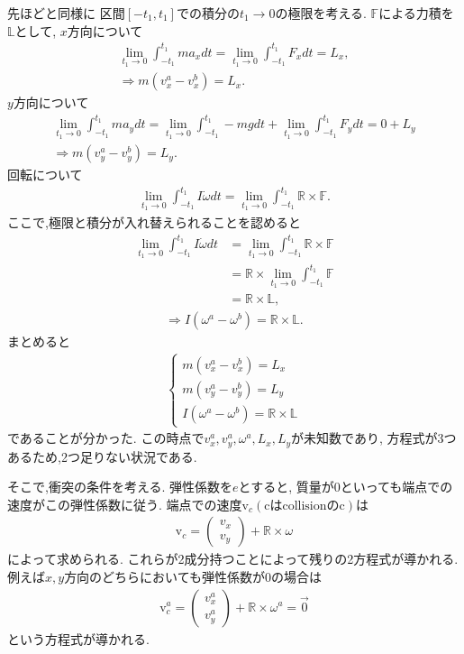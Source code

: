 \documentclass[a4paper,11pt]{jsarticle}
\begin{document}
先ほどと同様に
区間$[-t_1, t_1]$での積分の$t_1\rightarrow 0$の極限を考える.
$\mathbb{F}$による力積を$\mathbb{L}$として,
$x$方向について
\begin{gather*}
  \lim_{t_1 \rightarrow 0}\int_{-t_1}^{t_1} m a_x dt = \lim_{t_1 \rightarrow 0}\int_{-t_1}^{t_1} F_x dt = L_x,
  \\
  \Rightarrow
  m (v_x^a - v_x^b) = L_x.
\end{gather*}
$y$方向について
\begin{gather*}
  \lim_{t_1 \rightarrow 0}\int_{-t_1}^{t_1} m a_y dt
  = \lim_{t_1 \rightarrow 0}\int_{-t_1}^{t_1} -mg dt 
  + \lim_{t_1 \rightarrow 0}\int_{-t_1}^{t_1} F_y dt = 0 + L_y
  \\
  \Rightarrow
  m (v_y^a - v_y^b) = L_y.
\end{gather*}
回転について
\begin{align*}
  \lim_{t_1 \rightarrow 0} \int_{-t_1}^{t_1} I\dot\omega dt
  = \lim_{t_1 \rightarrow 0} \int_{-t_1}^{t_1} \mathbb{R} \times \mathbb{F}.
\end{align*}
ここで,極限と積分が入れ替えられることを認めると
\begin{align*}
  \lim_{t_1 \rightarrow 0} \int_{-t_1}^{t_1} I\dot\omega dt
  &= \lim_{t_1 \rightarrow 0} \int_{-t_1}^{t_1} \mathbb{R} \times \mathbb{F}
  \\ &= \mathbb{R} \times \lim_{t_1 \rightarrow 0} \int_{-t_1}^{t_1} \mathbb{F}
  \\ &= \mathbb{R} \times \mathbb{L},
\end{align*}
\begin{gather*}
  \Rightarrow
  I (\omega^a - \omega^b) = \mathbb{R} \times \mathbb{L}.
\end{gather*}
まとめると
\begin{gather*}
  \begin{cases}
    m (v_x^a - v_x^b) = L_x
    \\
    m (v_y^a - v_y^b) = L_y
    \\
    I (\omega^a - \omega^b) = \mathbb{R} \times \mathbb{L}
  \end{cases}
\end{gather*}
であることが分かった.
この時点で$v_x^a, v_y^a, \omega^a, L_x, L_y$が未知数であり,
方程式が3つあるため,2つ足りない状況である.

そこで,衝突の条件を考える.
弾性係数を$e$とすると,
質量が0といっても端点での速度がこの弾性係数に従う.
端点での速度$\mathrm{v}_c (\text{cはcollisionのc})$は
\begin{gather}
  \mathrm{v}_c = \begin{pmatrix}
    v_x
    \\
    v_y
  \end{pmatrix} + \mathbb{R} \times \omega
\end{gather}
によって求められる.
これらが2成分持つことによって残りの2方程式が導かれる.
例えば$x,y$方向のどちらにおいても弾性係数が0の場合は
\begin{gather*}
  \mathrm{v}_c^a = \begin{pmatrix}
    v_x^a
    \\
    v_y^a
  \end{pmatrix} + \mathbb{R} \times \omega^a = \vec{0}
\end{gather*}
という方程式が導かれる.
\end{document}
